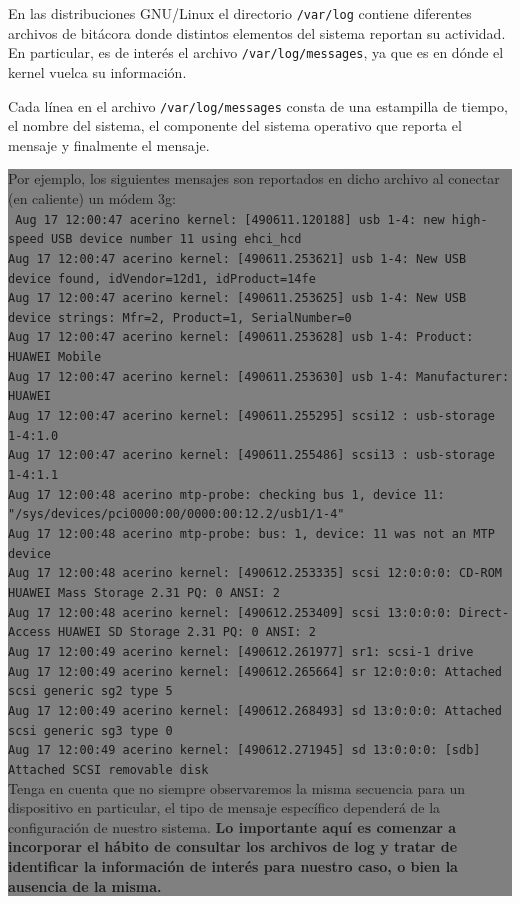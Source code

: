 \documentclass[12pt]{article}
\begin{document}
En las distribuciones GNU/Linux el directorio \texttt{/var/log} contiene diferentes 
archivos de bitácora donde distintos elementos del sistema reportan su actividad. En 
particular, es de interés el archivo \texttt{/var/log/messages}, ya que es en dónde 
el kernel vuelca su información. 

Cada línea en el archivo \texttt{/var/log/messages} consta de una estampilla de tiempo, 
el nombre del sistema, el componente del sistema operativo que reporta el mensaje y 
finalmente el mensaje. 

\colorbox{grey}{\parbox[t]{0.95\linewidth}{ \vspace*{0.5cm} { 
Por ejemplo, los siguientes mensajes son reportados en dicho archivo al conectar (en caliente) un módem 3g:\\
{\tt
Aug 17 12:00:47 acerino kernel: [490611.120188] usb 1-4: new high-speed USB device number 11 using ehci\_hcd\\
Aug 17 12:00:47 acerino kernel: [490611.253621] usb 1-4: New USB device found, idVendor=12d1, idProduct=14fe\\
Aug 17 12:00:47 acerino kernel: [490611.253625] usb 1-4: New USB device strings: Mfr=2, Product=1, SerialNumber=0\\
Aug 17 12:00:47 acerino kernel: [490611.253628] usb 1-4: Product: HUAWEI Mobile\\
Aug 17 12:00:47 acerino kernel: [490611.253630] usb 1-4: Manufacturer: HUAWEI\\
Aug 17 12:00:47 acerino kernel: [490611.255295] scsi12 : usb-storage 1-4:1.0\\
Aug 17 12:00:47 acerino kernel: [490611.255486] scsi13 : usb-storage 1-4:1.1\\
Aug 17 12:00:48 acerino mtp-probe: checking bus 1, device 11: "/sys/devices/pci0000:00/0000:00:12.2/usb1/1-4"\\
Aug 17 12:00:48 acerino mtp-probe: bus: 1, device: 11 was not an MTP device\\
Aug 17 12:00:48 acerino kernel: [490612.253335] scsi 12:0:0:0: CD-ROM            HUAWEI   Mass Storage     2.31 PQ: 0 ANSI: 2\\
Aug 17 12:00:48 acerino kernel: [490612.253409] scsi 13:0:0:0: Direct-Access     HUAWEI   SD Storage       2.31 PQ: 0 ANSI: 2\\
Aug 17 12:00:49 acerino kernel: [490612.261977] sr1: scsi-1 drive\\
Aug 17 12:00:49 acerino kernel: [490612.265664] sr 12:0:0:0: Attached scsi generic sg2 type 5\\
Aug 17 12:00:49 acerino kernel: [490612.268493] sd 13:0:0:0: Attached scsi generic sg3 type 0\\
Aug 17 12:00:49 acerino kernel: [490612.271945] sd 13:0:0:0: [sdb] Attached SCSI removable disk\\
}
Tenga en cuenta que no siempre observaremos la misma secuencia para un dispositivo en particular, 
el tipo de mensaje específico dependerá de la configuración de nuestro sistema. \textbf{Lo 
importante aquí es comenzar a incorporar el hábito de consultar los archivos de log y tratar de 
identificar la información de interés para nuestro caso, o bien la ausencia de la misma.} 
} \vspace*{0.5cm} } } 
\end{document}

